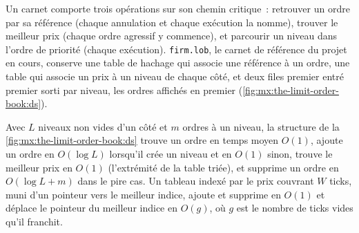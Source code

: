 Un carnet comporte trois opérations sur son chemin critique~: retrouver un ordre par sa référence (chaque annulation et chaque exécution la nomme), trouver le meilleur prix (chaque
ordre agressif y commence), et parcourir un niveau dans l'ordre de priorité (chaque exécution). \texttt{firm.lob}, le carnet de référence du projet en cours,
conserve une table de hachage qui associe une référence à un ordre, une table qui associe un prix à un niveau de chaque côté, et deux files premier entré premier sorti par niveau, les ordres affichés
en premier (\cref{fig:mx:the-limit-order-book:ds}).

\begin{omfigure}

\label{fig:mx:the-limit-order-book:ds}
\end{omfigure}

\label{lst:mx:the-limit-order-book:lob}

\begin{proposition}\label{prop:mx:the-limit-order-book:cost}
Avec $L$ niveaux non vides d'un côté et $m$ ordres à un niveau, la structure de la \cref{fig:mx:the-limit-order-book:ds} trouve un ordre en temps moyen
$O(1)$, ajoute un ordre en $O(\log L)$ lorsqu'il crée un niveau et en $O(1)$ sinon, trouve le meilleur prix en $O(1)$ (l'extrémité de la table triée), et
supprime un ordre en $O(\log L+m)$ dans le pire cas. Un tableau indexé par le prix couvrant $W$ ticks, muni d'un pointeur vers le meilleur indice, ajoute et supprime en $O(1)$
et déplace le pointeur du meilleur indice en $O(g)$, où $g$ est le nombre de ticks vides qu'il franchit.
\end{proposition}

